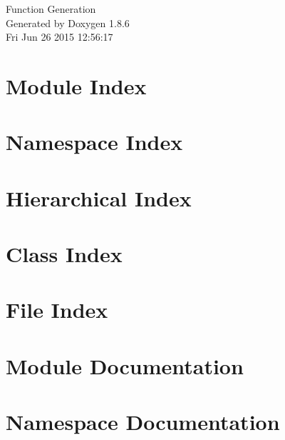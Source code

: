 \documentclass[twoside]{book}
\newcommand{\clearemptydoublepage}{%
  \newpage{\pagestyle{empty}\cleardoublepage}%
}
\begin{document}
\hypersetup{pageanchor=false}
\begin{titlepage}
\vspace*{7cm}
\begin{center}%
{\Large Function Generation }\\
\vspace*{1cm}
{\large Generated by Doxygen 1.8.6}\\
\vspace*{0.5cm}
{\small Fri Jun 26 2015 12:56:17}\\
\end{center}
\end{titlepage}
\clearemptydoublepage
\tableofcontents
\clearemptydoublepage
{}
\hypersetup{pageanchor=true}

\chapter{Module Index}

\chapter{Namespace Index}

\chapter{Hierarchical Index}

\chapter{Class Index}

\chapter{File Index}

\chapter{Module Documentation}












\chapter{Namespace Documentation}





\end{document}
